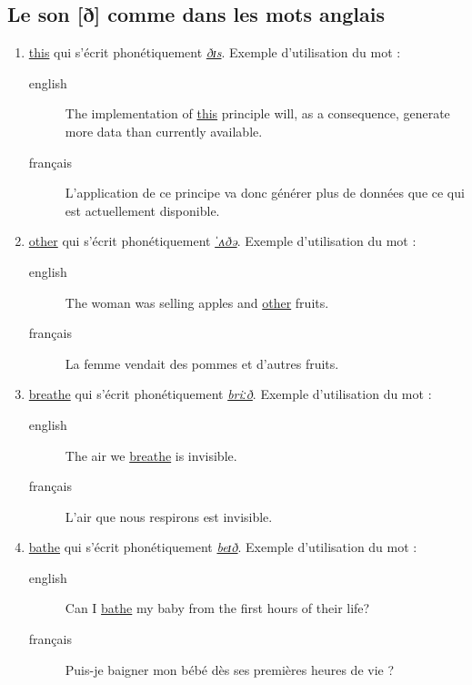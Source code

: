 \subsection{Le son [ð] comme dans les mots anglais}
\label{sec:orge02dbdd}
\begin{enumerate}
\item \href{http://www.wordreference.com/enfr/this}{this} qui s'écrit phonétiquement \href{https://en.oxforddictionaries.com/definition/this}{\emph{ðɪs}}. Exemple d'utilisation du mot :
\begin{description}
\item[{english}] \textenglish{The implementation of \href{https://youtu.be/KqzlYTmFBGY}{this} principle will, as a
consequence, generate more data than currently available.}
\item[{français}] L'application de ce principe va donc générer plus de
données que ce qui est actuellement disponible.
\end{description}
\item \href{http://www.wordreference.com/enfr/other}{other} qui s'écrit phonétiquement \href{https://en.oxforddictionaries.com/definition/other}{\emph{ˈʌðə}}. Exemple d'utilisation du mot :
\begin{description}
\item[{english}] \textenglish{The woman was selling apples and \href{https://youtu.be/9gXP8wcICqQ}{other} fruits.}
\item[{français}] La femme vendait des pommes et d'autres fruits.
\end{description}
\item \href{http://www.wordreference.com/enfr/breathe}{breathe} qui s'écrit phonétiquement \href{https://en.oxforddictionaries.com/definition/breathe}{\emph{briːð}}. Exemple d'utilisation du mot :
\begin{description}
\item[{english}] \textenglish{The air we \href{https://youtu.be/V8rtJRlLdI8}{breathe} is invisible.}
\item[{français}] L'air que nous respirons est invisible.
\end{description}
\item \href{http://www.wordreference.com/enfr/bathe}{bathe} qui s'écrit phonétiquement \href{https://dictionary.cambridge.org/dictionary/english/bathe}{\emph{beɪð}}. Exemple d'utilisation du mot :
\begin{description}
\item[{english}] \textenglish{Can I \href{https://youtu.be/U9V8cx2buG0}{bathe} my baby from the first hours of their
life?}
\item[{français}] Puis-je baigner mon bébé dès ses premières heures de
vie ?
\end{description}
\end{enumerate}
